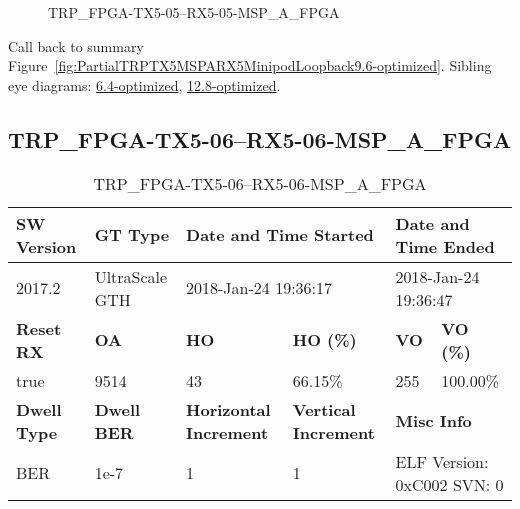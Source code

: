 \begin{figure}[h]
\caption{TRP\_FPGA-TX5-05--RX5-05-MSP\_A\_FPGA} \label{fig:TRPFPGATX505RX505MSPAFPGA9.6-optimized}
\end{figure}

Call back to summary Figure~\ref{fig:PartialTRPTX5MSPARX5MinipodLoopback9.6-optimized}.
Sibling eye diagrams: \hyperref[sec:TRPFPGATX505RX505MSPAFPGA6.4-optimized]{6.4-optimized}, \hyperref[sec:TRPFPGATX505RX505MSPAFPGA12.8-optimized]{12.8-optimized}.

\clearpage
\newpage


\subsection{TRP\_FPGA-TX5-06--RX5-06-MSP\_A\_FPGA}\label{sec:TRPFPGATX506RX506MSPAFPGA9.6-optimized}

\begin{table}[h]
\centering
\caption{TRP\_FPGA-TX5-06--RX5-06-MSP\_A\_FPGA}
\label{tab:TRPFPGATX506RX506MSPAFPGA9.6-optimized}
\begin{tabular}{@{}|l|l|l|l|l|l|@{}}
\toprule
\textbf{SW Version}                & \textbf{GT Type}   & \multicolumn{2}{l|}{\textbf{Date and Time Started}}            & \multicolumn{2}{l|}{\textbf{Date and Time Ended}}        \\ \midrule
2017.2                       & UltraScale GTH          & \multicolumn{2}{l|}{2018-Jan-24 19:36:17}                   & \multicolumn{2}{l|}{2018-Jan-24 19:36:47}               \\ \midrule
\textbf{Reset RX}                  & \textbf{OA} & \textbf{HO}   & \textbf{HO (\%)} & \textbf{VO} & \textbf{VO (\%)} \\ \midrule
true & 9514        & 43          & 66.15\%        & 255        & 100.00\%       \\ \midrule
\textbf{Dwell Type}                & \textbf{Dwell BER} & \textbf{Horizontal Increment} & \textbf{Vertical Increment}    & \multicolumn{2}{l|}{\textbf{Misc Info}}                  \\ \midrule
BER                            & 1e-7        & 1        & 1           & \multicolumn{2}{l|}{ELF Version: 0xC002 SVN: 0}                         \\ \bottomrule
\end{tabular}
\end{table}

